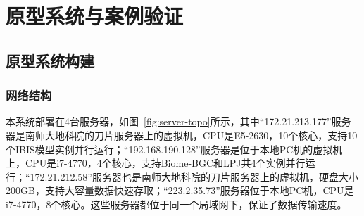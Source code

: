 \chapter{原型系统与案例验证}
\section{原型系统构建}
\subsection{网络结构}
本系统部署在4台服务器，如图~\ref{fig:server-topo}所示，其中“172.21.213.177”服务器是南师大地科院的刀片服务器上的虚拟机，CPU是E5-2630，10个核心，支持10个IBIS模型实例并行运行；“192.168.190.128”服务器是位于本地PC机的虚拟机上，CPU是i7-4770，4个核心，支持Biome-BGC和LPJ共4个实例并行运行；“172.21.212.58”服务器也是南师大地科院的刀片服务器上的虚拟机，硬盘大小200GB，支持大容量数据快速存取；“223.2.35.73”服务器位于本地PC机，CPU是i7-4770，8个核心。这些服务器都位于同一个局域网下，保证了数据传输速度。


